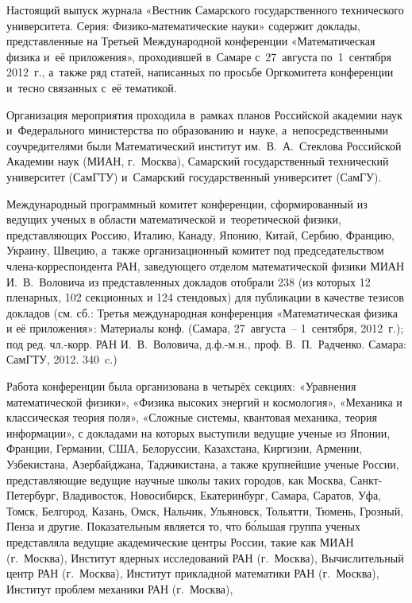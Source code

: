 Настоящий выпуск журнала «Вестник Самарского государственного технического университета. Серия: Физико-математические науки» содержит доклады, представленные на Третьей Международной конференции «Математическая физика и~её приложения», проходившей в~Самаре с~27~августа по~1~сентября 2012~г., а~также ряд статей, написанных по просьбе Оргкомитета конференции и~тесно связанных с~её тематикой. 





Организация мероприятия проходила в~рамках планов Российской академии наук и~Федерального министерства по образованию и~науке, а~непосредственными соучредителями были Математический институт им.~В.~А.~Стеклова Российской Академии наук (МИАН, г.~Москва), Самарский государственный технический университет (СамГТУ) и~Самарский государственный университет (СамГУ). 



Международный программный комитет конференции, сформированный из ведущих ученых в области математической и~теоретической физики, представляющих Россию, Италию, Канаду, Японию, Китай, Сербию, Францию, Украину, Швецию, а~также организационный комитет под председательством члена-корреспондента РАН, заведующего отделом математической физики МИАН И.~В.~Воловича из представленных докладов отобрали 238 (из которых 12 пленарных, 102 секционных и 124 стендовых) для публикации в качестве тезисов докладов (см. сб.: Третья международная конференция «Математическая физика и её приложения»: Материалы конф. (Самара, 27~августа~– 1~сентября, 2012~г.); под ред. чл.-корр. РАН И.~В.~Воловича, д.ф.-м.н., проф. В.~П.~Радченко. Самара: СамГТУ, 2012. 340~c.) 







Работа конференции была организована в четырёх секциях: «Уравнения математической физики», «Физика высоких энергий и космология», «Механика и классическая теория поля», «Сложные системы, квантовая механика, теория информации», с докладами на которых выступили ведущие ученые из Японии, Франции, Германии, США, Белоруссии, Казахстана, Киргизии, Армении, Узбекистана, Азербайджана, Таджикистана, а также крупнейшие ученые России, представляющие ведущие научные школы таких городов, как Москва, Санкт-Петербург, Владивосток, Новосибирск, Екатеринбург, Самара, Саратов, Уфа, Томск, Белгород, Казань, Омск, Нальчик, Ульяновск, Тольятти, Тюмень, Грозный, Пенза и другие. Показательным является то, что б\'ольшая группа ученых представляла ведущие академические центры России, такие как МИАН (г.~Москва), Институт ядерных исследований РАН (г.~Москва), Вычислительный центр РАН (г.~Москва), Институт прикладной математики РАН (г.~Москва), Институт проблем механики РАН (г.~Москва), 

